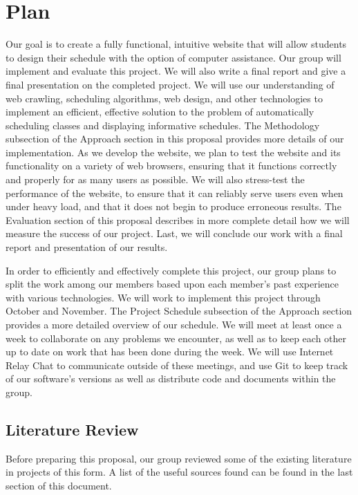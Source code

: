 \section{Plan}
Our goal is to create a fully functional, intuitive website that will allow students to design their 
schedule with the option of computer assistance. Our group will implement and evaluate this project.
We will also write a final report and give a final presentation  on the completed project. We will use our
understanding of web crawling, scheduling algorithms, web design,
and other technologies to implement an efficient, effective solution to the problem of automatically
scheduling classes and displaying informative schedules. The Methodology subsection 
of the Approach section in this proposal provides more details of our implementation.
As we develop the website, we plan to test the website and its functionality on a variety
of web browsers, ensuring that it functions correctly and properly for as many users as possible.
We will also stress-test the performance of the website, to ensure that it can reliably serve
users even when under heavy load, and that it does not begin to produce erroneous results.
The Evaluation section of this proposal describes in more complete detail how we will measure
the success of our project. Last, we will conclude our work with a final report and presentation of our
results.

In order to efficiently and effectively complete this project, our group plans to split the work among
our members based upon each member's past experience with various technologies. We will work
to implement this project through October and November. The Project Schedule subsection 
of the Approach section provides a more detailed overview of our schedule.
We will meet at least once a week to collaborate on any problems we encounter, as well
as to keep each other up to date on work that has been done during the week. We will
use Internet Relay Chat to communicate outside of these meetings, and use Git to
keep track of our software's versions as well as distribute code and documents within
the group.

\subsection{Literature Review}

Before preparing this proposal, our group reviewed some of the existing literature in projects of this form.
A list of the useful sources found can be found in the last section of this document.

